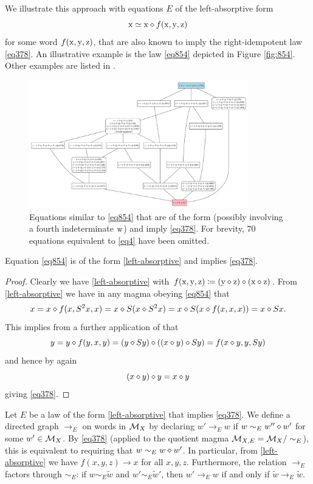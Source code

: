 We illustrate this approach with equations $E$ of the left-absorptive form
\begin{equation}\label{left-absorptive}
\mathrm{x} \simeq \mathrm{x} \diamond f(\mathrm{x},\mathrm{y},\mathrm{z})
\end{equation}
for some word $f(\mathrm{x},\mathrm{y},\mathrm{z})$, that are also known to imply the right-idempotent law \eqref{eq378}.  An illustrative example is the law \eqref{eq854} depicted in Figure \ref{fig:854}. Other examples are listed in .

\begin{figure}
  \centering
  \includegraphics[width=0.85\textwidth]{854-like.png}
  \caption{Equations similar to \eqref{eq854} that are of the form  (possibly involving a fourth indeterminate $\mathrm{w}$) and imply \eqref{eq378}.  For brevity, $70$ equations equivalent to \eqref{eq4} have been omitted.}
  \label{fig:854-like}
  \end{figure}


\begin{lemma}\label{854} Equation \eqref{eq854} is of the form \eqref{left-absorptive} and implies \eqref{eq378}.
\end{lemma}

\begin{proof}  Clearly we have \eqref{left-absorptive} with $f(\mathrm{x},\mathrm{y},\mathrm{z}) \coloneqq (\mathrm{y} \diamond \mathrm{z}) \diamond (\mathrm{x} \diamond \mathrm{z})$.  From \ref{left-absorptive} we have in any magma obeying \eqref{eq854} that
$$x = x \diamond f(x,S^2 x,x) = x \diamond S(x \diamond S^2 x) = x \diamond S(x \diamond f(x,x,x)) = x \diamond Sx.$$
This implies from a further application of  that
$$ y = y \diamond f(y,x,y) = (y \diamond Sy) \diamond ((x \diamond y) \diamond Sy) = f(x \diamond y, y, Sy)$$
and hence by  again
$$ (x \diamond y) \diamond y = x \diamond y$$
giving \eqref{eq378}.
\end{proof}

Let $E$ be a law of the form \eqref{left-absorptive} that implies \eqref{eq378}. We define a directed graph $\to_E$ on words in ${\mathcal{M}}_X$ by declaring $w' \to_E w$ if $w \sim_E w'' \diamond w'$ for some $w' \in {\mathcal{M}}_X$.  By \eqref{eq378} (applied to the quotient magma ${\mathcal{M}}_{X,E} = {\mathcal{M}}_X/\sim_E$), this is equivalent to requiring that $w \sim_E w \diamond w'$. In particular, from \eqref{left-absorptive} we have $f(x,y,z) \to x$ for all $x,y,z$.  Furthermore, the relation $\to_E$ factors through $\sim_E$: if $w \sim_E \tilde w$ and $w' \sim_E \tilde w'$, then $w' \to_E w$ if and only if $\tilde w \to_E \tilde w$.

